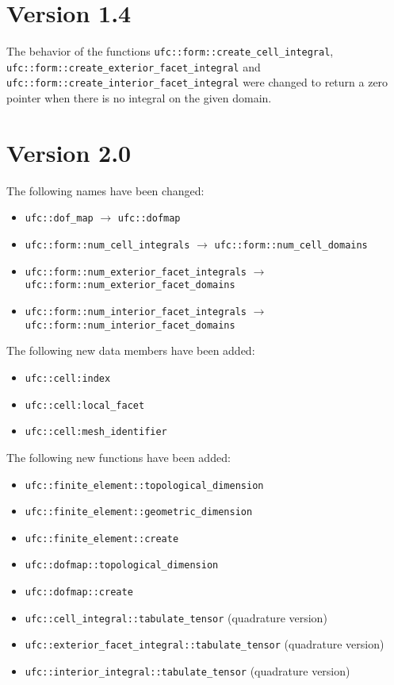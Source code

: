 \section{Version 1.4}

The behavior of the functions
\texttt{ufc::form::create\_cell\_integral},
\texttt{ufc::form::create\_exterior\_facet\_integral} and
\texttt{ufc::form::create\_interior\_facet\_integral} were changed to
return a zero pointer when there is no integral on the given domain.

\section{Version 2.0}

The following names have been changed:
\begin{itemize}
\item
  \texttt{ufc::dof\_map} $\rightarrow$ \texttt{ufc::dofmap}
\item
  \texttt{ufc::form::num\_cell\_integrals} $\rightarrow$ \texttt{ufc::form::num\_cell\_domains}
\item
  \texttt{ufc::form::num\_exterior\_facet\_integrals} $\rightarrow$ \texttt{ufc::form::num\_exterior\_facet\_domains}
\item
  \texttt{ufc::form::num\_interior\_facet\_integrals} $\rightarrow$ \texttt{ufc::form::num\_interior\_facet\_domains}
\end{itemize}

The following new data members have been added:
\begin{itemize}
\item
  \texttt{ufc::cell:index}
\item
  \texttt{ufc::cell:local\_facet}
\item
  \texttt{ufc::cell:mesh\_identifier}
\end{itemize}

The following new functions have been added:
\begin{itemize}
\item
  \texttt{ufc::finite\_element::topological\_dimension}
\item
  \texttt{ufc::finite\_element::geometric\_dimension}
\item
  \texttt{ufc::finite\_element::create}
\item
  \texttt{ufc::dofmap::topological\_dimension}
\item
  \texttt{ufc::dofmap::create}
\item
  \texttt{ufc::cell\_integral::tabulate\_tensor} (quadrature version)
\item
  \texttt{ufc::exterior\_facet\_integral::tabulate\_tensor} (quadrature version)
\item
  \texttt{ufc::interior\_integral::tabulate\_tensor} (quadrature version)
\end{itemize}

